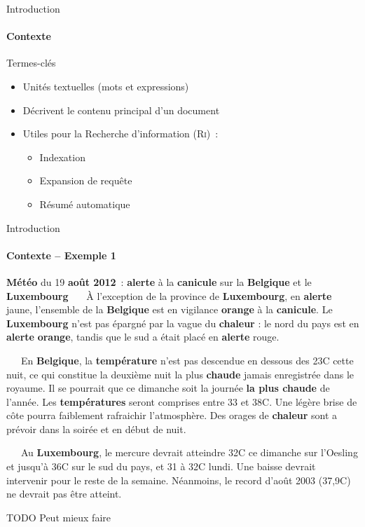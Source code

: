 \begin{frame}{Introduction}\framesubtitle{Contexte}
  \begin{block}{Termes-clés}
    \begin{itemize}
      \item{Unités textuelles (mots et expressions)}
      \item{Décrivent le contenu principal d'un document}
      \item{Utiles pour la Recherche d'information (\textsc{Ri})~:}
      \begin{itemize}
        \item{Indexation}
        \item{Expansion de requête}
        \item{Résumé automatique}
      \end{itemize}
    \end{itemize}
  \end{block}
\end{frame}

\begin{frame}{Introduction}\framesubtitle{Contexte -- Exemple 1}
  \begin{exampleblock}{\small
    \textbf{\normalsize Météo} du 19 \textbf{\normalsize août 2012}~:
    \textbf{\normalsize alerte} à la \textbf{\normalsize canicule} sur la
    \textbf{\normalsize Belgique} et le \textbf{\normalsize Luxembourg}
  }\justifying\small
    ~~~À l'exception de la province de \textbf{\normalsize Luxembourg}, en
    \textbf{\normalsize alerte} jaune, l'ensemble de la \textbf{\normalsize
    Belgique} est en vigilance \textbf{\normalsize orange} à la
    \textbf{\normalsize canicule}. Le \textbf{\normalsize Luxembourg} n'est pas
    épargné par la vague du \textbf{\normalsize chaleur} : le nord du pays est
    en \textbf{\normalsize alerte} \textbf{\normalsize orange}, tandis que le
    sud a était placé en \textbf{\normalsize alerte} rouge.

    ~~~En \textbf{\normalsize Belgique}, la \textbf{\normalsize température}
    n'est pas descendue en dessous des 23\degre{}C cette nuit, ce qui constitue
    la deuxième nuit la plus \textbf{\normalsize chaude} jamais enregistrée dans
    le royaume. Il se pourrait que ce dimanche soit la journée
    \textbf{\normalsize la plus chaude} de l'année. Les \textbf{\normalsize
    températures} seront comprises entre 33 et 38\degre{}C. Une légère brise de
    côte pourra faiblement rafraichir l'atmosphère. Des orages de
    \textbf{\normalsize chaleur} sont a prévoir dans la soirée et en début de
    nuit.

    ~~~Au \textbf{\normalsize Luxembourg}, le mercure devrait atteindre
    32\degre{}C ce dimanche sur l'Oesling et jusqu'à 36\degre{}C sur le sud du
    pays, et 31 à 32\degre{}C lundi. Une baisse devrait intervenir pour le reste
    de la semaine. Néanmoins, le record d'août 2003 (37,9\degre{}C) ne devrait
    pas être atteint.
  \end{exampleblock}

  \begin{alertblock}{TODO}
    Peut mieux faire
  \end{alertblock}
\end{frame}

